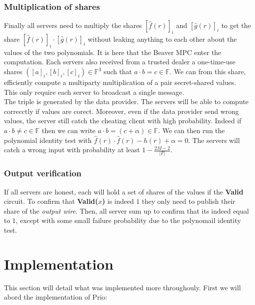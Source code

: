 \documentclass{article}
\begin{document}
\subsubsection{Multiplication of shares}
Finally all servers need to multiply the shares $ [\hat{f}(r)]_i $ and $ [\hat{g}(r)]_i$ to get the share $[\hat{f}(r)]_i \cdot [\hat{g}(r)]_i$ without leaking anything to each other about the values of the two polynomials. It is here that the Beaver MPC enter the computation. Each servers also received from a trusted dealer a one-time-use shares $([a]_i,[b]_i,[c]_i) \in \mathbb{F}^3 $ such that $a \cdot b = c \in \mathbb{F}$. We can from this share, efficiently compute a multiparty multiplication of a pair secret-shared values. This only require each server to broadcast a single message.\\
The triple is generated by the data provider. The servers will be able to compute correcctly if values are corect. Moreover, even if the data provider send wrong values, the server still catch the cheating client with high probability. Indeed if $a \cdot b \neq c \in \mathbb{F}$ then we can write $a \cdot b = (c + \alpha) \in \mathbb{F}$. We can then run the polynomial identity test with $\hat{f}(r) \cdot \hat{f}(r) - h(r) + \alpha = 0$. The servers will catch a wrong input with probability at least $1 - \frac{2M-2}{|F|}$.

\subsubsection{Output verification}
If all servers are honest, each will hold a set of shares of the values if the \textbf{Valid} circuit. To confirm that \textbf{Valid($x$)} is indeed $1$ they only need to publish their share of the \textit{output wire}. Then, all server sum up to confirm that its indeed equal to $1$, except with some small failure probability due to the polynomail identity test.


\section{Implementation}
 This section will detail what was implemented more throughouly.
First we will abord the implementation of Prio:\\
\end{document}
